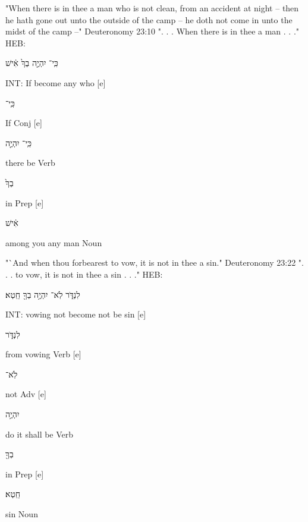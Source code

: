 \documentclass[11pt]{article}
\begin{document}
"When there is in thee a man who is not clean, from an accident at night -- then he hath gone out unto the outside of the camp -- he doth not come in unto the midst of the camp --"\newline
Deuteronomy 23:10 \newline
". . . When there is in thee a man . . ." \newline
HEB:\begin{hebrew} כִּֽי־ יִהְיֶ֤ה בְךָ֙ אִ֔ישׁ\end{hebrew}\newline
INT: If become any who [e]%
\begin{hebrew}	כִּֽי־\end{hebrew}	If	Conj [e]%
\begin{hebrew} כִּֽי־ יִהְיֶ֤ה \end{hebrew}	there be	Verb\newline
\phantom{1961 [e]	}\begin{hebrew} בְךָ֙	\end{hebrew} in	Prep [e]%
\begin{hebrew} אִ֔ישׁ	\end{hebrew}among you any man	Noun\newline

"`And when thou forbearest to vow, it is not in thee a sin."\newline
Deuteronomy 23:22 \newline
". . . to vow, it is not in thee a sin . . ."
HEB:\begin{hebrew} לִנְדֹּ֑ר לֹֽא־ יִהְיֶ֥ה בְךָ֖ חֵֽטְא׃ \end{hebrew}\newline
INT: vowing not become not be sin [e]%
\begin{hebrew}	לִנְדֹּ֑ר	\end{hebrew}from vowing	Verb [e]%
\begin{hebrew}	לֹֽא־	\end{hebrew}not	Adv [e]%
\begin{hebrew}יִהְיֶ֥ה\end{hebrew}	do it shall be	Verb\newline
\phantom{1961 [e]	}\begin{hebrew}בְךָ֖\end{hebrew}	in	Prep [e]%
\begin{hebrew} חֵֽטְא׃  \end{hebrew}	sin	Noun\newline
\end{document}
